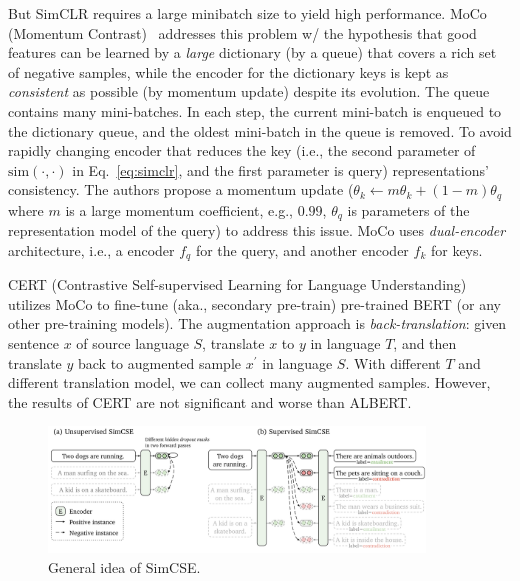 But SimCLR requires a large minibatch size to yield high performance.
MoCo (Momentum Contrast)~ addresses this problem w/ the hypothesis that good features can be learned by a \emph{large} dictionary (by a queue) that covers a rich set of negative samples, while the encoder for the dictionary keys is kept as \emph{consistent} as possible (by momentum update) despite its evolution.
The queue contains many mini-batches.
In each step, the current mini-batch is enqueued to the dictionary queue, and the oldest mini-batch in the queue is removed.
To avoid rapidly changing encoder that reduces the key (i.e., the second parameter of $\text{sim}(\cdot, \cdot)$ in Eq.~\ref{eq:simclr}, and the first parameter is query) representations’ consistency.
The authors propose a momentum update ($\theta_k \leftarrow m\theta_k + (1 - m) \theta_q$ where $m$ is a large momentum coefficient, e.g., $0.99$, $\theta_q$ is parameters of the representation model of the query) to address this issue.
MoCo uses \emph{dual-encoder} architecture, i.e., a encoder $f_q$ for the query, and another encoder $f_k$ for keys.

CERT (Contrastive Self-supervised Learning for Language Understanding)~ utilizes MoCo to fine-tune (aka., secondary pre-train) pre-trained BERT (or any other pre-training models).
The augmentation approach is \emph{back-translation}: given sentence $x$ of source language $S$, translate $x$ to $y$ in language $T$, and then translate $y$ back to augmented sample $x^\prime$ in language $S$.
With different $T$ and different translation model, we can collect many augmented samples.
However, the results of CERT are not significant and worse than ALBERT.

\begin{figure}[!thp]
	\centerline{\includegraphics[width=10.0cm]{figs/SimCSE.png}}
	\caption{General idea of SimCSE.}
	\label{fig:SimCSE}
\end{figure}

